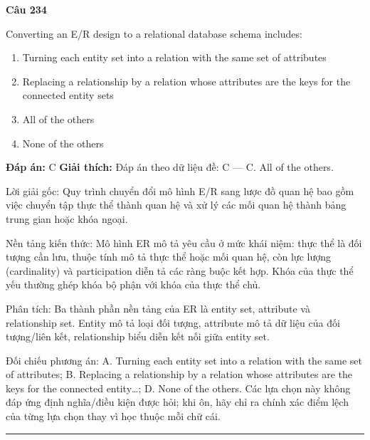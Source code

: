 \documentclass[11pt,a4paper]{article}
\newenvironment{question}[1]{%
  \par\vspace{1em}\noindent\textbf{\large Câu #1}\par\vspace{0.4em}
}{%
  \par\vspace{1em}\hrule\vspace{0.6em}
}
\newenvironment{choices}{%
  \begin{enumerate}[label=\textbf{\Alph*.},leftmargin=2.2em,itemsep=2pt,topsep=3pt]
}{%
  \end{enumerate}
}
\newcommand{\choice}{\item}
\begin{document}
\begin{question}{234}
Converting an E/R design to a relational database schema includes:
\begin{choices}
\choice Turning each entity set into a relation with the same set of attributes
\choice Replacing a relationship by a relation whose attributes are the keys for the connected entity sets
\choice All of the others
\choice None of the others
\end{choices}
\textbf{Đáp án:} C
\textbf{Giải thích:} Đáp án theo dữ liệu đề: C — C. All of the others.

Lời giải gốc: Quy trình chuyển đổi mô hình E/R sang lược đồ quan hệ bao gồm việc chuyển tập thực thể thành quan hệ và xử lý các mối quan hệ thành bảng trung gian hoặc khóa ngoại.

Nền tảng kiến thức: Mô hình ER mô tả yêu cầu ở mức khái niệm: thực thể là đối tượng cần lưu, thuộc tính mô tả thực thể hoặc mối quan hệ, còn lực lượng (cardinality) và participation diễn tả các ràng buộc kết hợp. Khóa của thực thể yếu thường ghép khóa bộ phận với khóa của thực thể chủ.

Phân tích: Ba thành phần nền tảng của ER là entity set, attribute và relationship set. Entity mô tả loại đối tượng, attribute mô tả dữ liệu của đối tượng/liên kết, relationship biểu diễn kết nối giữa entity set.

Đối chiếu phương án: A. Turning each entity set into a relation with the same set of attributes; B. Replacing a relationship by a relation whose attributes are the keys for the connected entity…; D. None of the others. Các lựa chọn này không đáp ứng định nghĩa/điều kiện được hỏi; khi ôn, hãy chỉ ra chính xác điểm lệch của từng lựa chọn thay vì học thuộc mỗi chữ cái.
\end{question}
\end{document}
